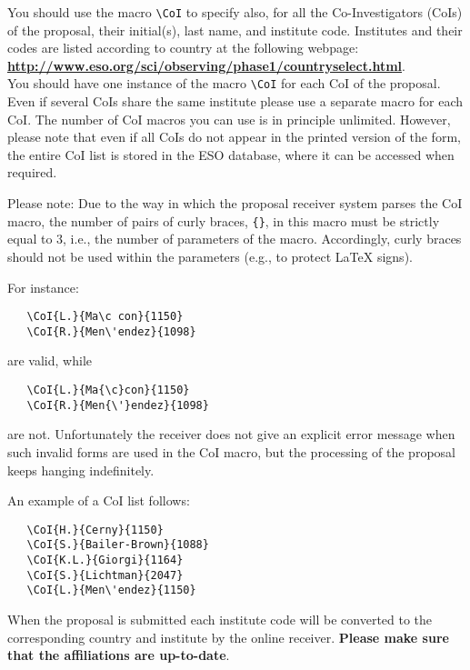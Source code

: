\documentclass{article}
\begin{document}
You should use the macro \verb|\CoI| to specify also, for
all the Co-Investigators (CoIs) of the proposal, their initial(s),
last name, and institute code. Institutes and their codes are listed 
according to country at the following webpage:\\
\href{http://www.eso.org/sci/observing/phase1/countryselect.html}
{\bf\underline{http://www.eso.org/sci/observing/phase1/countryselect.html}}.\\
You should have one instance of the macro \verb|\CoI| for each CoI of the
proposal. Even if several CoIs share the same institute
please use a separate macro for each CoI. The number of CoI macros you can 
use is in principle unlimited. However, please note that 
even if all CoIs do not appear in the printed version of the form,
the entire  CoI list is stored in the ESO database, where it
can be accessed when required.

Please note: Due to the way in which the proposal receiver system parses
the CoI macro, the number of pairs of curly braces, \verb|{}|,
in this macro must be strictly equal to 3, i.e., the
number of parameters of the macro. Accordingly, curly
braces should not be used within the parameters (e.g.,
to protect LaTeX signs).

\noindent
For instance:
\begin{verbatim}
   \CoI{L.}{Ma\c con}{1150}
   \CoI{R.}{Men\'endez}{1098}
\end{verbatim}

\noindent
are valid, while

\begin{verbatim}
   \CoI{L.}{Ma{\c}con}{1150}
   \CoI{R.}{Men{\'}endez}{1098}
\end{verbatim}

\noindent
are not. Unfortunately the receiver does not give an
explicit error message when such invalid forms are
used in the CoI macro, but the processing of the proposal
keeps hanging indefinitely.

\vspace{0.5cm}
An example of a CoI list follows:
\begin{verbatim}
   \CoI{H.}{Cerny}{1150}
   \CoI{S.}{Bailer-Brown}{1088}
   \CoI{K.L.}{Giorgi}{1164}
   \CoI{S.}{Lichtman}{2047}
   \CoI{L.}{Men\'endez}{1150}
\end{verbatim}

When the proposal is submitted each institute code will be converted to the
corresponding country and institute by the online receiver. {\bf Please make sure that the affiliations are up-to-date}.
\end{document}
